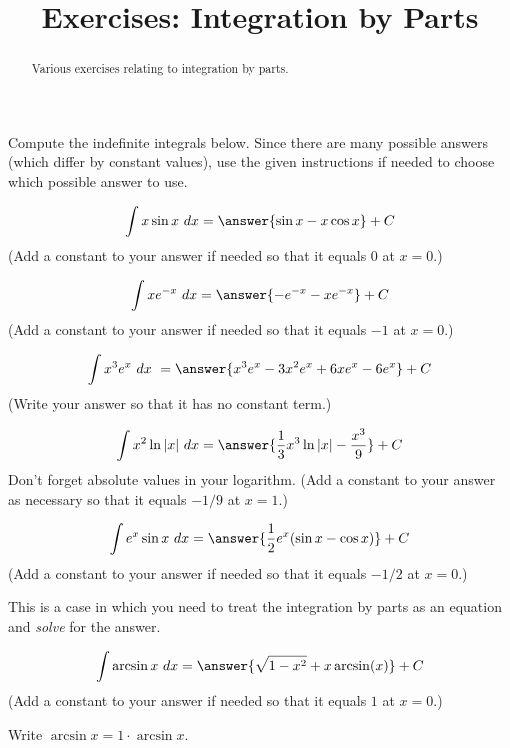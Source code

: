 \documentclass{ximera}
\title{Exercises: Integration by Parts}
\begin{document}
\begin{abstract}
Various exercises relating to integration by parts.
\end{abstract}
\maketitle


Compute the indefinite integrals below. Since there are many possible answers (which differ by constant values), use the given instructions if needed to choose which possible answer to use.

\begin{exercise}%
\[  \int x\sin x\ dx = \answer{\sin x - x\cos x} +C\]
(Add a constant to your answer if needed so that it equals $0$ at $x = 0$.)
%
%
\end{exercise}

\begin{exercise}%
\[ \int xe^{-x}\ dx = \answer{-e^{-x}-xe^{-x}}+C\]
(Add a constant to your answer if needed so that it equals $-1$ at $x = 0$.)
%
%
\end{exercise}

\begin{exercise}%
\[  \int x^3e^{x}\ dx\ = \answer{x^3e^x-3x^2e^x+6xe^x-6e^x}+C\]
(Write your answer so that it has no constant term.)
%
%
\end{exercise}

\begin{exercise}%
\[ \int x^2\ln |x| \ dx = \answer{\frac{1}{3} x^3 \ln |x|-\frac{x^3}{9}}+C\]
Don't forget absolute values in your logarithm.
(Add a constant to your answer as necessary so that it equals $-1/9$ at $x = 1$.)
%
%
\end{exercise}

\begin{exercise}%
\[ \int e^x\sin x\ dx = \answer{\frac{1}{2} e^x(\sin x-\cos x)}+C\]
(Add a constant to your answer if needed so that it equals $-1/2$ at $x = 0$.)
\begin{hint}
This is a case in which you need to treat the integration by parts as an equation and \textit{solve} for the answer.
\end{hint}
%
%
\end{exercise}

\begin{exercise}%
\[ \int \arcsin x\ dx = \answer{\sqrt{1-x^2}+x \arcsin(x)}+C \]
(Add a constant to your answer if needed so that it equals $1$ at $x = 0$.)
\begin{hint}
Write $\arcsin x = 1 \cdot \arcsin x$.
\end{hint}
%
%
\end{exercise}
\end{document}
